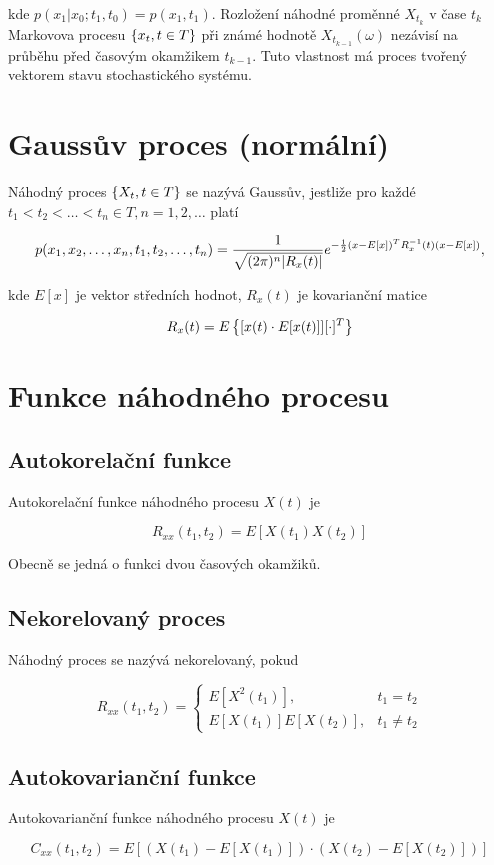 kde $p(x_1|x_0;t_1,t_0)=p(x_1,t_1)$. Rozložení náhodné proměnné $X_{t_k}$ v čase $t_k$ Markovova procesu $\brs{x_t,t\in T}$ při známé hodnotě $X_{t_{k-1}}(\omega)$ nezávisí na průběhu před časovým okamžikem $t_{k-1}$. Tuto vlastnost má proces tvořený vektorem stavu stochastického systému.

\section{Gaussův proces (normální)}
Náhodný proces $\brs{X_t,t\in T}$ se nazývá Gaussův, jestliže pro každé $t_1<t_2<\ldots<t_n\in T, n=1,2,\ldots$ platí

\[ p(\vecrow[x],\vecrow[t])=\frac{1}{\sqrt{(2\pi)^n |R_x(t)|}} e^{-\frac{1}{2}(x-E[x])^T R_x^{-1}(t)(x-E[x])}, \]

kde $E[x]$ je vektor středních hodnot, $R_x(t)$ je kovarianční matice

\[ R_x(t)=E\brs{[x(t)\cdot E[x(t)]][\cdot]^T} \]

\section{Funkce náhodného procesu}
\subsection{Autokorelační funkce}
Autokorelační funkce náhodného procesu $X(t)$ je 

\[ R_{xx}(t_1,t_2)=E[X(t_1)X(t_2)] \]

Obecně se jedná o funkci dvou časových okamžiků.

\subsection{Nekorelovaný proces}
Náhodný proces se nazývá nekorelovaný, pokud

\[
R_{xx}(t_1,t_2) = 
\begin{cases}
	E[X^2(t_1)], & t_1=t_2\\ 
	E[X(t_1)]E[X(t_2)],&t_1\neq t_2
\end{cases}
\]

\subsection{Autokovarianční funkce}
Autokovarianční funkce náhodného procesu $X(t)$ je

\[ C_{xx}(t_1,t_2) = E[(X(t_1)-E[X(t_1)])\cdot (X(t_2)-E[X(t_2)])] \]

